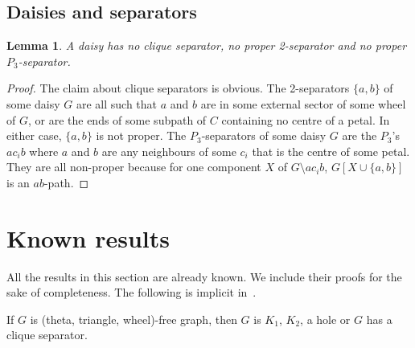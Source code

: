 \documentclass[11pt]{article}
\newtheorem{lemma}[theo]{Lemma}
\newcommand{\sm}{\setminus}
\begin{document}
\subsection*{Daisies and separators}

\begin{lemma}
  \label{l:decDaisy}
  A daisy has no clique separator, no proper 2-separator and no proper $P_3$-separator. 
\end{lemma}

\begin{proof}
  The claim about clique separators is obvious.  The 2-separators $\{a, b\}$ of some daisy $G$ are all such that $a$ and $b$ are in some external sector of some wheel of $G$, or are the ends of some subpath of $C$ containing no centre of a petal. In either case, $\{a, b\}$ is not proper.  The $P_3$-separators of some daisy $G$ are the $P_3$'s $a c_i b$ where $a$ and $b$ are any neighbours of some $c_i$ that is the centre of some petal.  They are all non-proper because for one component $X$ of $G\sm a c_i b$, $G[X\cup \{a, b\}]$ is  an $ab$-path. 
\end{proof}





\section{Known results}
\label{sec:know}


All the results in this section are already known. We include their proofs for the sake of completeness. The following is implicit in~\cite{confortiCKV97}.

\begin{theo}
\label{cor:us}
  If $G$ is (theta, triangle, wheel)-free graph, then $G$ is $K_1$, $K_2$, a hole or $G$ has a clique separator.  
\end{theo}
\end{document}
